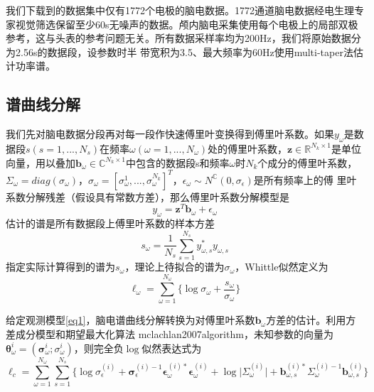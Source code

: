 我们下载到的数据集中仅有1772个电极的脑电数据。1772通道脑电数据经电生理专家视觉筛选保留至少60s无噪声的数据。颅内脑电采集使用每个电极上的局部双极参考，这与头表的参考问题无关。所有数据采样率均为200Hz，我们将原始数据分为2.56s的数据段，设参数时半
带宽积为3.5、最大频率为60Hz使用multi-taper法估计功率谱。

\subsection{谱曲线分解}
我们先对脑电数据分段再对每一段作快速傅里叶变换得到傅里叶系数。如果$y_\omega$是数据段$s(s=1,...,N_s)$在频率$\omega(\omega=1,...,N_\omega)$处的傅里叶系数，$\mathbf{z}\in{\mathbb{R}^{N_k\times{1}}}$是单位向量，用以叠加$\mathbf{b}_\omega\in{\mathbb{C}^{N_k\times{1}}}$中包含的数据段s和频率$\omega$时$N_k$个成分的傅里叶系数，$\Sigma_\omega=diag(\sigma_\omega)$，$\sigma_\omega=[\sigma_\omega^1,...,\sigma_\omega^{N_k}]^T$，$\epsilon_\omega\sim{N^\mathbb{C}(0,\sigma_\epsilon)}$是所有频率上的傅
里叶系数分解残差（假设具有常数方差），那么傅里叶系数分解模型是
\begin{equation}\label{eq1}
y_\omega=\mathbf{z}^T\mathbf{b}_\omega+\epsilon_\omega
\end{equation}
估计的谱是所有数据段上傅里叶系数的样本方差
\begin{equation}\label{eq2}
s_\omega=\frac{1}{N_s}\sum_{s=1}^{N_s}y_{\omega,s}^*y_{\omega,s}
\end{equation}
指定实际计算得到的谱为$s_\omega$，理论上待拟合的谱为$\sigma_\omega$，Whittle似然定义为
\begin{equation}\label{eq3}
\ell_\omega=\sum_{\omega=1}^{N_\omega}\lbrace\log{\sigma_\omega}+\frac{s_\omega}{\sigma_\omega}\rbrace
\end{equation}

给定观测模型\eqref{eq1}，脑电谱曲线分解转换为对傅里叶系数$\mathbf{b}_\omega$方差的估计。利用方差成分模型和期望最大化算法\citing
{mclachlan2007algorithm}，未知参数的向量为$\mathbf{\theta}_\omega^{i}=(\mathbf{\sigma}_\omega^{i};\sigma_\omega^{i})$，则完全负$\log$似然表达式为
\begin{equation}\label{eq4}
\ell_c=\sum_{\omega=1}^{N_\omega}\sum_{s=1}^{N_s}\lbrace\log{\sigma}_\epsilon^{(i)}+\mathbf{\sigma}_\epsilon^{(i)-1}\mathbf{\epsilon}_\omega^{(i)*}\mathbf{\epsilon}_\omega^{(i)}+\log\lvert\Sigma_\omega^{(i)}\rvert+\mathbf{b}_{\omega,s}^{(i)*}\Sigma_\omega^{(i)-1}\mathbf{b}_{\omega,s}^{(i)}\rbrace
\end{equation}

